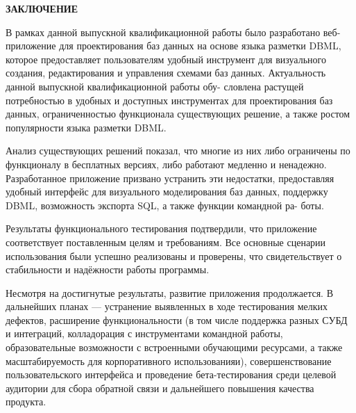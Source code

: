\newpage
\begin{center}
\textbf{\large ЗАКЛЮЧЕНИЕ}
\end{center}


В рамках данной выпускной квалификационной работы было
разработано веб-приложение для проектирования баз данных на основе языка разметки DBML, которое предоставляет пользователям удобный инструмент для визуального создания, редактирования и управления схемами баз данных.
Актуальность данной выпускной квалификационной работы обу-
словлена растущей потребностью в удобных и доступных инструментах для
проектирования баз данных, ограниченностью функционала существующих решение, а также ростом популярности языка разметки DBML.

Анализ существующих решений показал, что многие из них либо
ограничены по функционалу в бесплатных версиях, либо работают медленно и ненадежно. Разработанное приложение призвано
устранить эти недостатки, предоставляя удобный интерфейс для визуального моделирования баз данных, поддержку
DBML, возможность экспорта SQL, а также функции командной ра-
боты.

Результаты функционального тестирования подтвердили, что
приложение соответствует поставленным целям и требованиям. Все основные
сценарии использования были успешно реализованы и проверены, что
свидетельствует о стабильности и надёжности работы программы.

Несмотря на достигнутые результаты, развитие приложения
продолжается. В дальнейших планах — устранение выявленных в ходе
тестирования мелких дефектов, расширение функциональности (в том числе
поддержка разных СУБД и интеграций, колладорация с инструментами командной работы, образовательные возможности с встроенными обучающими ресурсами, а также масштабируемость для корпоративного использованияи), совершенствование пользовательского интерфейса и
проведение бета-тестирования среди целевой аудитории для сбора обратной
связи и дальнейшего повышения качества продукта.
